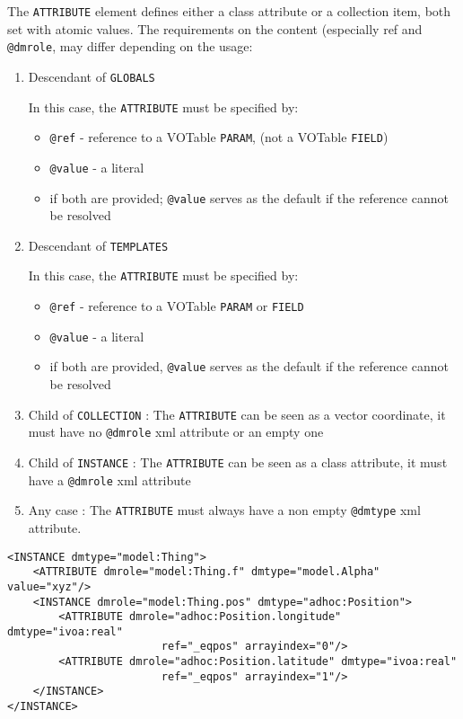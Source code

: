 
The \texttt{ATTRIBUTE} element defines either a class attribute or a collection item, both set with atomic values.
The requirements on
the content (especially ref and  \texttt{@dmrole}, may differ depending on
the usage:


\begin{enumerate}
\item Descendant of \texttt{GLOBALS}

In this case, the \texttt{ATTRIBUTE} must be specified by:
  \begin{itemize} 
      \item \texttt{@ref} - reference to a VOTable \texttt{PARAM}, 
      (not a VOTable \texttt{FIELD})
      \item \texttt{@value} - a literal
      \item  if both are provided; \texttt{@value} serves as the default 
      if the reference cannot be resolved
  \end{itemize}  

  
\item Descendant of \texttt{TEMPLATES} 

In this case, the \texttt{ATTRIBUTE} must be specified by:
  \begin{itemize} 
      \item \texttt{@ref} - reference to a VOTable \texttt{PARAM} 
      or \texttt{FIELD}
      \item \texttt{@value} - a literal
      \item if both are provided, \texttt{@value} serves as the default if 
      the reference cannot be resolved
  \end{itemize}  

\item Child of \texttt{COLLECTION} :
    The \texttt{ATTRIBUTE} can be seen as a vector coordinate, 
    it must have  no \texttt{@dmrole} xml attribute or an empty one
    
\item Child of \texttt{INSTANCE} :
    The \texttt{ATTRIBUTE} can be seen as a class attribute, 
    it must have a \texttt{@dmrole} xml attribute
           
\item Any case :     
    The \texttt{ATTRIBUTE} must always have a non empty \texttt{@dmtype} xml attribute.
\end{enumerate}  
    
    
\begin{lstlisting}[frame=single,caption={ATTRIBUTE examples},style=XML,basicstyle=\tiny]
<INSTANCE dmtype="model:Thing">
    <ATTRIBUTE dmrole="model:Thing.f" dmtype="model.Alpha" value="xyz"/>		
    <INSTANCE dmrole="model:Thing.pos" dmtype="adhoc:Position">
        <ATTRIBUTE dmrole="adhoc:Position.longitude" dmtype="ivoa:real" 
                        ref="_eqpos" arrayindex="0"/>
        <ATTRIBUTE dmrole="adhoc:Position.latitude" dmtype="ivoa:real" 
                        ref="_eqpos" arrayindex="1"/>
    </INSTANCE>
</INSTANCE>
\end{lstlisting}  


